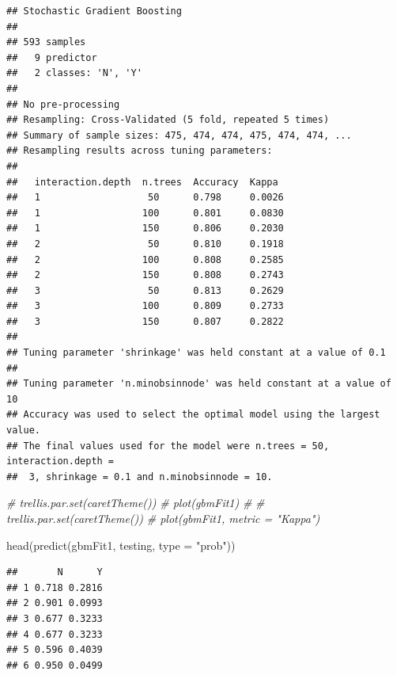 \documentclass[
]{book}
\newenvironment{Shaded}{\begin{snugshade}}{\end{snugshade}}
\newcommand{\AttributeTok}[1]{\textcolor[rgb]{0.77,0.63,0.00}{#1}}
\newcommand{\CommentTok}[1]{\textcolor[rgb]{0.56,0.35,0.01}{\textit{#1}}}
\newcommand{\FunctionTok}[1]{\textcolor[rgb]{0.00,0.00,0.00}{#1}}
\newcommand{\NormalTok}[1]{#1}
\newcommand{\OtherTok}[1]{\textcolor[rgb]{0.56,0.35,0.01}{#1}}
\newcommand{\SpecialCharTok}[1]{\textcolor[rgb]{0.00,0.00,0.00}{#1}}
\newcommand{\StringTok}[1]{\textcolor[rgb]{0.31,0.60,0.02}{#1}}
\begin{document}
\begin{verbatim}
## Stochastic Gradient Boosting 
## 
## 593 samples
##   9 predictor
##   2 classes: 'N', 'Y' 
## 
## No pre-processing
## Resampling: Cross-Validated (5 fold, repeated 5 times) 
## Summary of sample sizes: 475, 474, 474, 475, 474, 474, ... 
## Resampling results across tuning parameters:
## 
##   interaction.depth  n.trees  Accuracy  Kappa 
##   1                   50      0.798     0.0026
##   1                  100      0.801     0.0830
##   1                  150      0.806     0.2030
##   2                   50      0.810     0.1918
##   2                  100      0.808     0.2585
##   2                  150      0.808     0.2743
##   3                   50      0.813     0.2629
##   3                  100      0.809     0.2733
##   3                  150      0.807     0.2822
## 
## Tuning parameter 'shrinkage' was held constant at a value of 0.1
## 
## Tuning parameter 'n.minobsinnode' was held constant at a value of 10
## Accuracy was used to select the optimal model using the largest value.
## The final values used for the model were n.trees = 50, interaction.depth =
##  3, shrinkage = 0.1 and n.minobsinnode = 10.
\end{verbatim}

\begin{Shaded}
\begin{Highlighting}[]
\CommentTok{\# trellis.par.set(caretTheme())}
\CommentTok{\# plot(gbmFit1)}
\CommentTok{\# }
\CommentTok{\# trellis.par.set(caretTheme())}
\CommentTok{\# plot(gbmFit1, metric = "Kappa")}

\FunctionTok{head}\NormalTok{(}\FunctionTok{predict}\NormalTok{(gbmFit1, testing, }\AttributeTok{type =} \StringTok{"prob"}\NormalTok{))}
\end{Highlighting}
\end{Shaded}

\begin{verbatim}
##       N      Y
## 1 0.718 0.2816
## 2 0.901 0.0993
## 3 0.677 0.3233
## 4 0.677 0.3233
## 5 0.596 0.4039
## 6 0.950 0.0499
\end{verbatim}

\begin{Shaded}
\end{Shaded}
\end{document}
